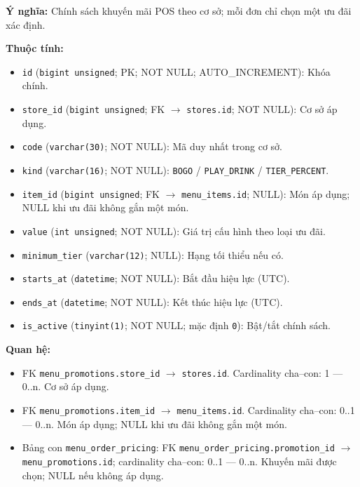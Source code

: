 \textbf{Ý nghĩa:} Chính sách khuyến mãi POS theo cơ sở; mỗi đơn chỉ chọn một ưu đãi xác định.\par

\textbf{Thuộc tính:}

\begin{itemize}

\item \texttt{id} (\texttt{bigint unsigned}; PK; NOT NULL; AUTO_INCREMENT): Khóa chính.

\item \texttt{store\_id} (\texttt{bigint unsigned}; FK $\rightarrow$ \texttt{stores.id}; NOT NULL): Cơ sở áp dụng.

\item \texttt{code} (\texttt{varchar(30)}; NOT NULL): Mã duy nhất trong cơ sở.

\item \texttt{kind} (\texttt{varchar(16)}; NOT NULL): \texttt{BOGO} / \texttt{PLAY\_DRINK} / \texttt{TIER\_PERCENT}.

\item \texttt{item\_id} (\texttt{bigint unsigned}; FK $\rightarrow$ \texttt{menu\_items.id}; NULL): Món áp dụng; NULL khi ưu đãi không gắn một món.

\item \texttt{value} (\texttt{int unsigned}; NOT NULL): Giá trị cấu hình theo loại ưu đãi.

\item \texttt{minimum\_tier} (\texttt{varchar(12)}; NULL): Hạng tối thiểu nếu có.

\item \texttt{starts\_at} (\texttt{datetime}; NOT NULL): Bắt đầu hiệu lực (UTC).

\item \texttt{ends\_at} (\texttt{datetime}; NOT NULL): Kết thúc hiệu lực (UTC).

\item \texttt{is\_active} (\texttt{tinyint(1)}; NOT NULL; mặc định \texttt{0}): Bật/tắt chính sách.

\end{itemize}

\textbf{Quan hệ:}

\begin{itemize}

\item FK \texttt{menu\_promotions.store\_id} $\rightarrow$ \texttt{stores.id}. Cardinality cha--con: 1 — 0..n. Cơ sở áp dụng.

\item FK \texttt{menu\_promotions.item\_id} $\rightarrow$ \texttt{menu\_items.id}. Cardinality cha--con: 0..1 — 0..n. Món áp dụng; NULL khi ưu đãi không gắn một món.

\item Bảng con \texttt{menu\_order\_pricing}: FK \texttt{menu\_order\_pricing.promotion\_id} $\rightarrow$ \texttt{menu\_promotions.id}; cardinality cha--con: 0..1 — 0..n. Khuyến mãi được chọn; NULL nếu không áp dụng.

\end{itemize}

